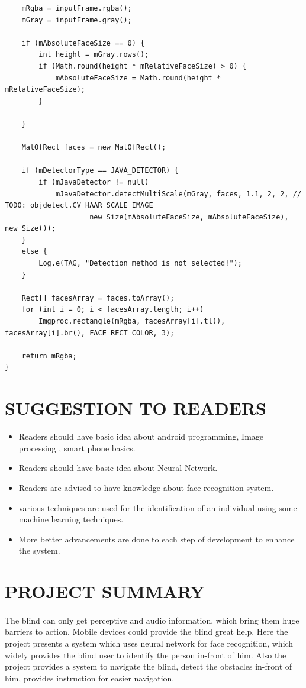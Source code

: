 \documentclass[11pt,a4paper,twoside]{report}
\begin{document}
\begin{appendix}
\begin{flushleft}
\begin{tiny}
\begin{lstlisting}
    mRgba = inputFrame.rgba();
    mGray = inputFrame.gray();

    if (mAbsoluteFaceSize == 0) {
        int height = mGray.rows();
        if (Math.round(height * mRelativeFaceSize) > 0) {
            mAbsoluteFaceSize = Math.round(height * mRelativeFaceSize);
        }

    }

    MatOfRect faces = new MatOfRect();

    if (mDetectorType == JAVA_DETECTOR) {
        if (mJavaDetector != null)
            mJavaDetector.detectMultiScale(mGray, faces, 1.1, 2, 2, // TODO: objdetect.CV_HAAR_SCALE_IMAGE
                    new Size(mAbsoluteFaceSize, mAbsoluteFaceSize), new Size());
    }
    else {
        Log.e(TAG, "Detection method is not selected!");
    }

    Rect[] facesArray = faces.toArray();
    for (int i = 0; i < facesArray.length; i++)
        Imgproc.rectangle(mRgba, facesArray[i].tl(), facesArray[i].br(), FACE_RECT_COLOR, 3);

    return mRgba;
}

\end{lstlisting}
\end{tiny}
\end{flushleft}
\section{SUGGESTION TO READERS}
\begin{itemize}
\item Readers should have basic idea about android programming, Image processing , smart phone basics.
\item Readers should have basic idea about Neural Network.
\item Readers are advised to have knowledge about face recognition system.
\item various techniques are used for the identification of an individual using some machine learning techniques.
\item More better advancements are done to each step of development to enhance the system.
\end{itemize}

\section{PROJECT SUMMARY}
\paragraph{ }The blind can only get perceptive and audio information, which bring them huge barriers to action. Mobile devices could provide the blind great help.
Here the project presents a system which uses neural network for face recognition, which widely provides the blind user to identify the person in-front of him. Also the  project provides a system to navigate the blind, detect the obstacles in-front of him, provides instruction for easier navigation.


\end{appendix}
\end{document}
